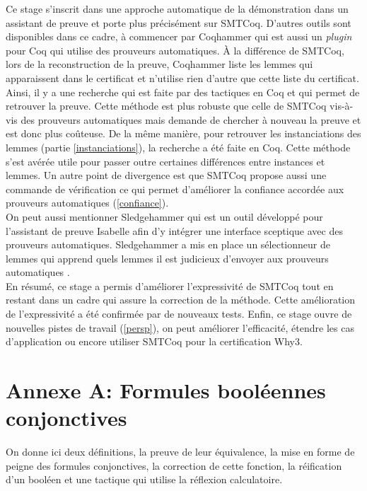 \documentclass[11pt]{article}
\begin{document}
Ce stage s'inscrit dans une approche automatique de la démonstration dans un assistant de preuve et porte plus précisément sur SMTCoq. D'autres outils sont disponibles dans ce cadre, à commencer par Coqhammer \cite{coqhammer} qui est aussi un \textit{plugin} pour Coq qui utilise des prouveurs automatiques. À la différence de SMTCoq, lors de la reconstruction de la preuve, Coqhammer liste les lemmes qui apparaissent dans le certificat et n'utilise rien d'autre que cette liste du certificat. Ainsi, il y a une recherche qui est faite par des tactiques en Coq et qui permet de retrouver la preuve. Cette méthode est plus robuste que celle  de SMTCoq vis-à-vis des prouveurs automatiques mais demande de chercher à nouveau la preuve et est donc plus coûteuse. De la même manière, pour retrouver les instanciations des lemmes (partie \ref{instanciations}), la recherche a été faite en Coq. Cette méthode s'est avérée utile pour passer outre certaines différences entre instances et lemmes. Un autre point de divergence est que SMTCoq propose aussi une commande de vérification ce qui permet d'améliorer la confiance accordée aux prouveurs automatiques (\ref{confiance}).\\
On peut aussi mentionner Sledgehammer \cite{sledgehammer_manual} qui est un outil développé pour l'assistant de preuve Isabelle afin d'y intégrer une interface sceptique avec des prouveurs automatiques. Sledgehammer a mis en place un sélectionneur de lemmes qui apprend quels lemmes il est judicieux d'envoyer aux prouveurs automatiques \cite{hol_selector}.\\

En résumé, ce stage a permis d'améliorer l'expressivité de SMTCoq tout en restant dans un cadre qui assure la correction de la méthode. Cette amélioration de l'expressivité a été confirmée par de nouveaux tests. Enfin, ce stage ouvre de nouvelles pistes de travail (\ref{persp}), on peut améliorer l'efficacité, étendre les cas d'application ou encore utiliser SMTCoq pour la certification Why3.



\newpage
\pagestyle{empty}
\renewcommand\refname{Bibliographie}
\nocite{*}
{}




\section*{Annexe A: Formules booléennes conjonctives}

On donne ici deux définitions, la preuve de leur équivalence, la mise en forme de peigne des formules conjonctives, la correction de cette fonction, la réification d'un booléen et une tactique qui utilise la réflexion calculatoire.
\end{document}

